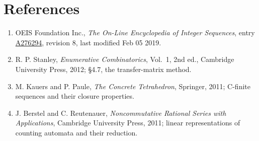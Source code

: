 \documentclass[11pt]{article}
\theoremstyle{definition}
\begin{document}
\section{References}

\begin{enumerate}

\item OEIS Foundation Inc., \emph{The On-Line Encyclopedia of Integer Sequences}, entry \href{https://oeis.org/A276294}{A276294}, revision 8, last modified Feb 05 2019.

\item R. P. Stanley, \emph{Enumerative Combinatorics}, Vol.~1, 2nd ed., Cambridge University Press, 2012; \S4.7, the transfer-matrix method.

\item M. Kauers and P. Paule, \emph{The Concrete Tetrahedron}, Springer, 2011; C-finite sequences and their closure properties.

\item J. Berstel and C. Reutenauer, \emph{Noncommutative Rational Series with Applications}, Cambridge University Press, 2011; linear representations of counting automata and their reduction.

\end{enumerate}
\end{document}
